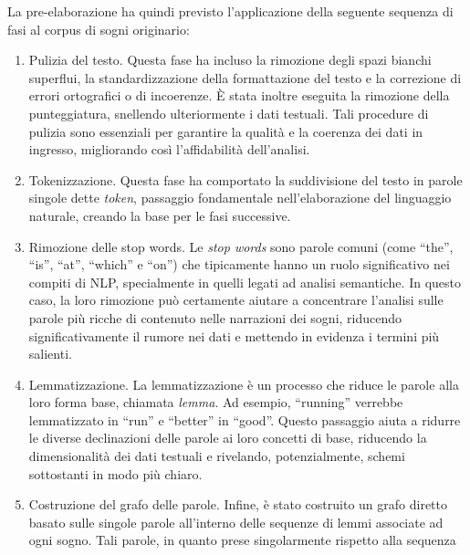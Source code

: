 La pre-elaborazione ha quindi previsto l'applicazione della seguente sequenza di fasi al corpus di sogni originario:
\begin{enumerate}
    \item Pulizia del testo. \newline \noindent
          Questa fase ha incluso la rimozione degli spazi bianchi superflui, la standardizzazione della
          formattazione del testo e la correzione di errori ortografici o di incoerenze. È stata inoltre eseguita la
          rimozione della punteggiatura, snellendo ulteriormente i dati testuali. Tali procedure di pulizia sono
          essenziali per garantire la qualità e la coerenza dei dati in ingresso, migliorando così l'affidabilità
          dell'analisi.
    \item Tokenizzazione. \newline \noindent
          Questa fase ha comportato la suddivisione del testo in parole singole dette \textit{token},
          passaggio fondamentale nell'elaborazione del linguaggio naturale, creando la base per le fasi successive.
    \item Rimozione delle stop words. \newline \noindent
          Le \textit{stop words} sono parole comuni (come ``the'', ``is'', ``at'', ``which'' e ``on'') che tipicamente
          hanno un ruolo significativo nei compiti di NLP, specialmente in quelli legati ad analisi semantiche.
          In questo caso, la loro rimozione può certamente aiutare a concentrare l'analisi sulle parole più ricche di
          contenuto nelle narrazioni dei sogni, riducendo significativamente il rumore nei dati e mettendo in evidenza
          i termini più salienti.
    \item Lemmatizzazione. \newline \noindent
          La lemmatizzazione è un processo che riduce le parole alla loro forma base, chiamata \textit{lemma}.
          Ad esempio, ``running'' verrebbe lemmatizzato in ``run'' e ``better'' in ``good''.
          Questo passaggio aiuta a ridurre le diverse declinazioni delle parole ai loro concetti di base, riducendo
          la dimensionalità dei dati testuali e rivelando, potenzialmente, schemi sottostanti in modo più chiaro.
    \item Costruzione del grafo delle parole. \newline \noindent
          Infine, è stato costruito un grafo diretto basato sulle singole parole all'interno delle sequenze
          di lemmi associate ad ogni sogno. Tali parole, in quanto prese singolarmente rispetto alla sequenza

\end{enumerate}
